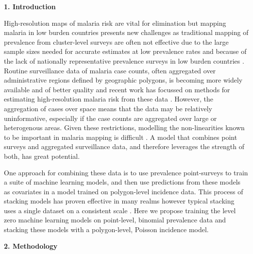 \documentclass[11pt]{article}
\begin{document}
\setlength{\parindent}{0pt}

{\bf 1. Introduction}



High-resolution maps of malaria risk are vital for elimination but mapping malaria in low burden countries presents new challenges as traditional mapping of prevalence from cluster-level surveys \citep{gething2011new, bhatt2017improved, gething2012long, bhatt2015effect} are often not effective due to the large sample sizes needed for accurate estimates at low prevalence rates and because of the lack of nationally representative prevalence surveys in low burden countries \citep{sturrock2016mapping, sturrock2014fine}. 
Routine surveillance data of malaria case counts, often aggregated over administrative regions defined by geographic polygons, is becoming more widely available and of better quality and recent work has focussed on methods for estimating high-resolution malaria risk from these data \citep{sturrock2014fine, wilson2017pointless, law2018variational, taylor2017continuous, li2012log}. 
However, the aggregation of cases over space means that the data may be relatively uninformative, especially if the case counts are aggregated over large or heterogenous areas. 
Given these restrictions, modelling the non-linearities known to be important in malaria mapping is difficult \cite{bhatt2017improved, bhatt2015effect}. 
A model that combines point surveys and aggregated surveillance data, and therefore leverages the strength of both, has great potential.
 
One approach for combining these data is to use prevalence point-surveys to train a suite of machine learning models, and then use predictions from these models as covariates in a model trained on polygon-level incidence data. 
This process of stacking models has proven effective in many realms however typical stacking uses a single dataset on a consistent scale \citep{sill2009feature, bhatt2017improved}. 
Here we propose training the level zero machine learning models on point-level, binomial prevalence data and stacking these models with a polygon-level, Poisson incidence model. 


{\bf 2. Methodology}
\end{document}
